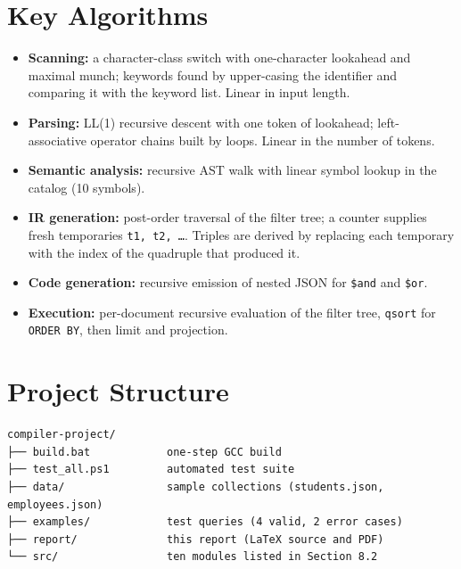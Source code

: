 \documentclass[12pt,a4paper]{report}
\newcommand{\codeus}{\textunderscore\allowbreak}
\DeclareRobustCommand{\code}[1]{\texttt{\let\_\codeus #1}}
\begin{document}
\section{Key Algorithms}
\begin{itemize}
  \item \textbf{Scanning:} a character-class switch with one-character lookahead and maximal munch; keywords found by upper-casing the identifier and comparing it with the keyword list. Linear in input length.
  \item \textbf{Parsing:} LL(1) recursive descent with one token of lookahead; left-associative operator chains built by loops. Linear in the number of tokens.
  \item \textbf{Semantic analysis:} recursive AST walk with linear symbol lookup in the catalog (10 symbols).
  \item \textbf{IR generation:} post-order traversal of the filter tree; a counter supplies fresh temporaries \code{t1, t2, \ldots}. Triples are derived by replacing each temporary with the index of the quadruple that produced it.
  \item \textbf{Code generation:} recursive emission of nested JSON for \code{\$and} and \code{\$or}.
  \item \textbf{Execution:} per-document recursive evaluation of the filter tree, \code{qsort} for \code{ORDER BY}, then limit and projection.
\end{itemize}

\section{Project Structure}
\begin{Verbatim}
compiler-project/
├── build.bat            one-step GCC build
├── test_all.ps1         automated test suite
├── data/                sample collections (students.json, employees.json)
├── examples/            test queries (4 valid, 2 error cases)
├── report/              this report (LaTeX source and PDF)
└── src/                 ten modules listed in Section 8.2
\end{Verbatim}
\end{document}
